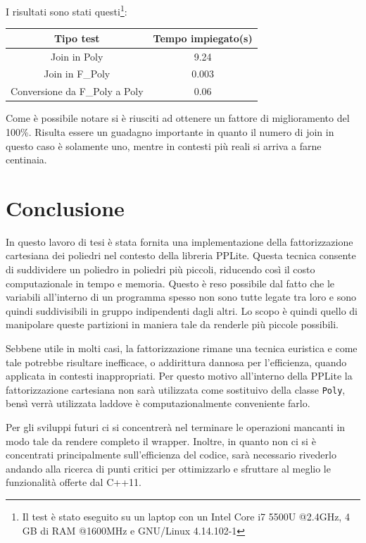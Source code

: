 \documentclass[italian]{mimosis}
\theoremstyle{definition}
\begin{document}
I risultati sono stati questi\footnote{Il test è stato eseguito su un laptop con un Intel Core i7 5500U
@2.4GHz, 4 GB di RAM @1600MHz e GNU/Linux 4.14.102-1}:
\begin{center}
\begin{tabular}{cc} \toprule
    \textbf{Tipo test} & \textbf{Tempo impiegato(s)}  \\ \midrule
    {Join in Poly}  & 9.24  \\
    {Join in F\_Poly}  & 0.003   \\
    {Conversione da F\_Poly a Poly}  & 0.06   \\ \bottomrule
\end{tabular}
\end{center}

Come è possibile notare si è riusciti ad ottenere un fattore di miglioramento
del 100\%. Risulta essere un guadagno importante in quanto il numero di join in
questo caso è solamente uno, mentre in contesti più reali si arriva a farne centinaia.
\chapter{Conclusione}
\label{sec:org7c31a34}
In questo lavoro di tesi è stata fornita una implementazione della
fattorizzazione cartesiana dei poliedri nel contesto della libreria PPLite.
Questa tecnica consente di suddividere un poliedro in poliedri più piccoli, riducendo così il
costo computazionale in tempo e memoria. Questo è reso possibile dal fatto che
le variabili all'interno di un programma spesso non sono tutte legate tra loro e
sono quindi suddivisibili in gruppo indipendenti dagli altri. Lo scopo è quindi
quello di manipolare queste partizioni in maniera tale da renderle più piccole
possibili.

Sebbene utile in molti casi, la fattorizzazione rimane una tecnica euristica
e come tale potrebbe risultare inefficace, o addirittura dannosa per
l'efficienza, quando applicata in contesti inappropriati. Per questo motivo
all'interno della PPLite la fattorizzazione cartesiana non sarà utilizzata come
sostituivo della classe \texttt{Poly}, bensì verrà utilizzata laddove è
computazionalmente conveniente farlo.

Per gli sviluppi futuri ci si concentrerà nel terminare le operazioni mancanti
in modo tale da rendere completo il wrapper. Inoltre, in quanto non ci si è
concentrati principalmente sull'efficienza del codice, sarà necessario rivederlo
andando alla ricerca di punti critici per ottimizzarlo e sfruttare al
meglio le funzionalità offerte dal C++11.


\renewcommand\bibname{Bibliografia}

\end{document}
